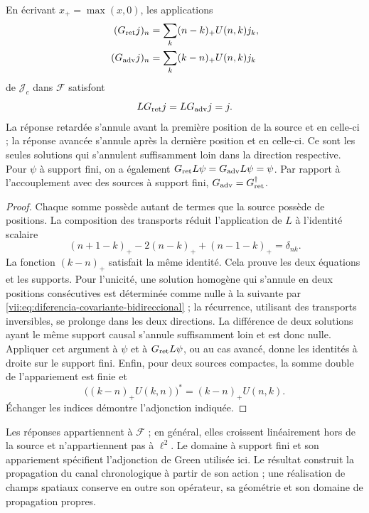 \begin{theorem}
\label{vii:thm:green-cronologico}
En écrivant \(x_+=\max(x,0)\), les applications
\begin{align}
 (G_{\rm ret}j)_n&=\sum_k(n-k)_+U(n,k)j_k,\label{vii:eq:green-ret-cronologico}\\
 (G_{\rm adv}j)_n&=\sum_k(k-n)_+U(n,k)j_k\label{vii:eq:green-adv-cronologico}
\end{align}
de \(\mathcal J_c\) dans \(\mathcal F\) satisfont
\[
 LG_{\rm ret}j=LG_{\rm adv}j=j.
\]
La réponse retardée s'annule avant la première position de la source et en celle-ci ; la réponse avancée s'annule après la dernière position et en celle-ci. Ce sont les seules solutions qui s'annulent suffisamment loin dans la direction respective. Pour \(\psi\) à support fini, on a également \(G_{\rm ret}L\psi=G_{\rm adv}L\psi=\psi\). Par rapport à l'accouplement avec des sources à support fini, \(G_{\rm adv}=G_{\rm ret}^{\dagger}\).
\end{theorem}
\begin{proof}
Chaque somme possède autant de termes que la source possède de positions.
La composition des transports réduit l'application de \(L\) à
l'identité scalaire
\[
 (n+1-k)_+-2(n-k)_++(n-1-k)_+=\delta_{nk}.
\]
La fonction \((k-n)_+\) satisfait la même identité. Cela prouve
les deux équations et les supports. Pour l'unicité, une solution
homogène qui s'annule en deux positions consécutives est déterminée
comme nulle à la suivante par \eqref{vii:eq:diferencia-covariante-bidireccional} ;
la récurrence, utilisant des transports inversibles, se prolonge dans les deux
directions. La différence de deux solutions ayant le même support causal
s'annule suffisamment loin et est donc nulle.
Appliquer cet argument à \(\psi\) et à \(G_{\rm ret}L\psi\), ou au
cas avancé, donne les identités à droite sur le support fini.
Enfin, pour deux sources compactes, la somme double de l'appariement
est finie et
\[
 \bigl((k-n)_+U(k,n)\bigr)^*=(k-n)_+U(n,k).
\]
Échanger les indices démontre l'adjonction indiquée.
\end{proof}

Les réponses appartiennent à \(\mathcal F\) ; en général, elles croissent
linéairement hors de la source et n'appartiennent pas à \(\ell^2\).
Le domaine à support fini et son appariement spécifient l'adjonction
de Green utilisée ici. Le résultat construit la propagation du canal
chronologique à partir de son action ; une réalisation de champs spatiaux conserve
en outre son opérateur, sa géométrie et son domaine de propagation propres.


